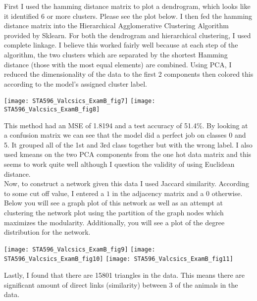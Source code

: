 \documentclass[10pt]{article}
\begin{document}
First I used the hamming distance matrix to plot a dendrogram, which looks like it identified 6 or more clusters. Please see the plot below. I then fed the hamming distance matrix into the Hierarchical Agglomerative Clustering Algorithm provided by Sklearn. For both the dendrogram and hierarchical clustering, I used complete linkage. I believe this worked fairly well because at each step of the algorithm, the two clusters which are separated by the shortest Hamming distance (those with the most equal elements) are combined. Using PCA, I reduced the dimensionality of the data to the first 2 components then colored this according to the model's assigned cluster label.  
\begin{center}
	\texttt{[image: STA596\_Valcsics\_ExamB\_fig7]}
	\texttt{[image: STA596\_Valcsics\_ExamB\_fig8]}
\end{center}
This method had an MSE of 1.8194 and a test accuracy of 51.4\%. By looking at a confusion matrix we can see that the model did a perfect job on classes 0 and 5. It grouped all of the 1st and 3rd class together but with the wrong label. I also used kmeans on the two PCA components from the one hot data matrix and this seems to work quite well although I question the validity of using Euclidean distance. \\

Now, to construct a network given this data I used Jaccard similarity. According to some cut off value, I entered a $1$ in the adjacency matrix and a $0$ otherwise. Below you will see a graph plot of this network as well as an attempt at clustering the network plot using the partition of the graph nodes which maximizes the modularity. Additionally, you will see a plot of the degree distribution for the network. 
\begin{center}
	\texttt{[image: STA596\_Valcsics\_ExamB\_fig9]}
	\texttt{[image: STA596\_Valcsics\_ExamB\_fig10]}
	\texttt{[image: STA596\_Valcsics\_ExamB\_fig11]}
\end{center}
Lastly, I found that there are 15801 triangles in the data. This means there are significant amount of direct links (similarity) between 3 of the animals in the data. 
\end{document}
